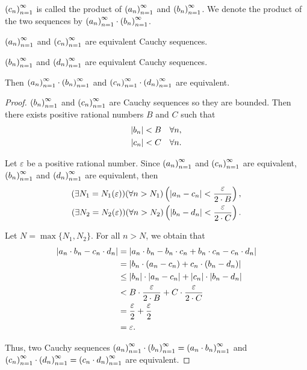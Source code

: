${\left({c_{n}}\right)}^{\infty}_{n=1}$ is called the product of ${\left({a_{n}}\right)}^{\infty}_{n=1}$ and ${\left({b_{n}}\right)}^{\infty}_{n=1}$. We denote the product of the two sequences by ${\left({a_{n}}\right)}^{\infty}_{n=1}\cdot{\left({b_{n}}\right)}^{\infty}_{n=1}$.

\begin{theorem}
    ${\left({a_{n}}\right)}^{\infty}_{n=1}$ and ${\left({c_{n}}\right)}^{\infty}_{n=1}$ are equivalent Cauchy sequences.

    ${\left({b_{n}}\right)}^{\infty}_{n=1}$ and ${\left({d_{n}}\right)}^{\infty}_{n=1}$ are equivalent Cauchy sequences.

    Then ${\left({a_{n}}\right)}^{\infty}_{n=1}\cdot{\left({b_{n}}\right)}^{\infty}_{n=1}$ and ${\left({c_{n}}\right)}^{\infty}_{n=1}\cdot{\left({d_{n}}\right)}^{\infty}_{n=1}$ are equivalent.
\end{theorem}

\begin{proof}
    ${\left({b_{n}}\right)}^{\infty}_{n=1}$  and ${\left({c_{n}}\right)}^{\infty}_{n=1}$ are Cauchy sequences so they are bounded. Then there exists positive rational numbers $B$ and $C$ such that
    \[
        \begin{split}
            \left\vert{b_{n}}\right\vert < B\quad\forall n, \\
            \left\vert{c_{n}}\right\vert < C\quad\forall n.
        \end{split}
    \]

    Let $\varepsilon$ be a positive rational number. Since ${\left({a_{n}}\right)}^{\infty}_{n=1}$ and ${\left({c_{n}}\right)}^{\infty}_{n=1}$ are equivalent, ${\left({b_{n}}\right)}^{\infty}_{n=1}$ and ${\left({d_{n}}\right)}^{\infty}_{n=1}$ are equivalent, then
    \[
        \begin{split}
            (\exists N_{1}=N_{1}(\varepsilon))(\forall n > N_{1})\left(\left\vert{a_{n} - c_{n}}\right\vert < \frac{\varepsilon}{2\cdot B}\right), \\
            (\exists N_{2}=N_{2}(\varepsilon))(\forall n > N_{2})\left(\left\vert{b_{n} - d_{n}}\right\vert < \frac{\varepsilon}{2\cdot C}\right).
        \end{split}
    \]

    Let $N = \max\{ N_{1}, N_{2} \}$. For all $n > N$, we obtain that
    \begin{align*}
        \left\vert{a_{n}\cdot b_{n} - c_{n}\cdot d_{n}}\right\vert & = \left\vert{a_{n}\cdot b_{n} - b_{n}\cdot c_{n} + b_{n}\cdot c_{n} - c_{n}\cdot d_{n}}\right\vert \\
                                                  & = \left\vert{b_{n}\cdot (a_{n} - c_{n}) + c_{n}\cdot (b_{n} - d_{n})}\right\vert                   \\
                                                  & \le \left\vert{b_{n}}\right\vert\cdot\left\vert{a_{n} - c_{n}}\right\vert + \left\vert{c_{n}}\right\vert\cdot\left\vert{b_{n} - d_{n}}\right\vert     \\
                                                  & < B\cdot\frac{\varepsilon}{2\cdot B} + C\cdot\frac{\varepsilon}{2\cdot C}         \\
                                                  & = \frac{\varepsilon}{2} + \frac{\varepsilon}{2}                                   \\
                                                  & = \varepsilon.
    \end{align*}

    Thus, two Cauchy sequences ${\left({a_{n}}\right)}^{\infty}_{n=1}\cdot{\left({b_{n}}\right)}^{\infty}_{n=1} = {\left({a_{n}\cdot b_{n}}\right)}^{\infty}_{n=1}$ and ${\left({c_{n}}\right)}^{\infty}_{n=1}\cdot{\left({d_{n}}\right)}^{\infty}_{n=1} = {\left({c_{n}\cdot d_{n}}\right)}^{\infty}_{n=1}$ are equivalent.
\end{proof}

